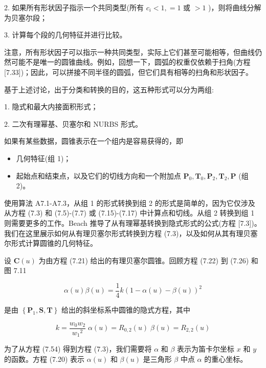 \documentclass[../main.tex]{subfiles}
\begin{document}
2. 如果所有形状因子指示一个共同类型(所有 \({c}_{i} < 1, = 1\) 或 \(> 1\) )，则将曲线分解为贝塞尔段；

3. 计算每个段的几何特征并进行比较。

注意，所有形状因子可以指示一种共同类型，实际上它们甚至可能相等，但曲线仍然可能不是唯一的圆锥曲线。例如，回想一下，圆弧的权重仅依赖于扫角(方程 [7.33])；因此，可以拼接不同半径的圆弧，但它们具有相等的扫角和形状因子。

基于上述讨论，出于分类和转换的目的，这五种形式可以分为两组:

1. 隐式和最大内接面积形式；

2. 二次有理幂基、贝塞尔和 NURBS 形式。

如果有某些数据，圆锥表示在一个组内是容易获得的，即

\begin{itemize}
\item 几何特征(组 1)；
\end{itemize}

\begin{itemize}
\item 起始点和结束点，以及它们的切线方向和一个附加点 \({\mathbf{P}}_{0},{\mathbf{T}}_{0},{\mathbf{P}}_{2},{\mathbf{T}}_{2},\mathbf{P}\) (组 2)。
\end{itemize}

使用算法 A7.1-A7.3，从组 1 的形式转换到组 2 的形式是简单的，因为它仅涉及从方程 (7.3) 和 (7.5)-(7.7) 或 (7.15)-(7.17) 中计算点和切线。从组 2 转换到组 1 则需要更多的工作。Beach \cite{Beac91} 推导了从有理幂基转换到隐式形式的公式(方程 [7.3])。我们在这里展示如何从有理贝塞尔形式转换到方程 (7.3)，以及如何从其有理贝塞尔形式计算圆锥的几何特征。

设 \(\mathbf{C}\left( u\right)\) 为由方程 (7.21) 给出的有理贝塞尔圆锥。回顾方程 (7.22) 到 (7.26) 和图 7.11

\[
\alpha \left( u\right) \beta \left( u\right)  = \frac{1}{4}k{\left( 1 - \alpha \left( u\right)  - \beta \left( u\right) \right) }^{2} \tag{7.54}
\]

是由 \(\left\{  {{\mathbf{P}}_{1},\mathbf{S},\mathbf{T}}\right\}\) 给出的斜坐标系中圆锥的隐式方程，其中

\[
k = \frac{{w}_{0}{w}_{2}}{{w}_{1}{}^{2}}\;\alpha \left( u\right)  = {R}_{0,2}\left( u\right) \;\beta \left( u\right)  = {R}_{2,2}\left( u\right)
\]

为了从方程 (7.54) 得到方程 (7.3)，我们需要将 \(\alpha\) 和 \(\beta\) 表示为笛卡尔坐标 \(x\) 和 \(y\) 的函数。方程 (7.20) 表示 \(\alpha \left( u\right)\) 和 \(\beta \left( u\right)\) 是三角形 \(\beta\) 中点 \(\alpha\) 的重心坐标。
\end{document}
